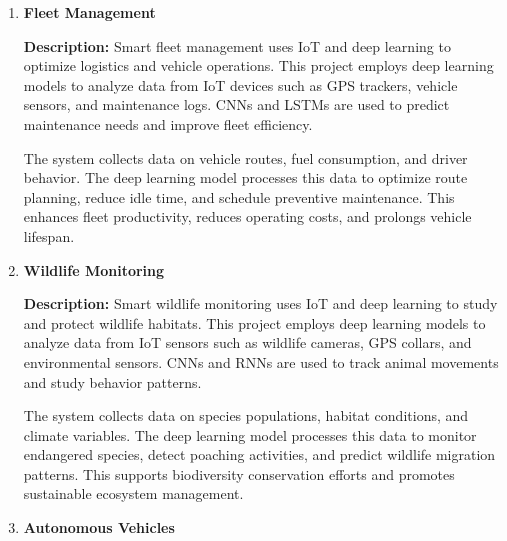\documentclass{article}
\begin{document}
\begin{enumerate}[label=\textbf{\arabic*.}, leftmargin=*]

\vspace{24pt} %
\item \textbf{Fleet Management}

\textbf{Description:}
Smart fleet management uses IoT and deep learning to optimize logistics and vehicle operations. This project employs deep learning models to analyze data from IoT devices such as GPS trackers, vehicle sensors, and maintenance logs. CNNs and LSTMs are used to predict maintenance needs and improve fleet efficiency.

The system collects data on vehicle routes, fuel consumption, and driver behavior. The deep learning model processes this data to optimize route planning, reduce idle time, and schedule preventive maintenance. This enhances fleet productivity, reduces operating costs, and prolongs vehicle lifespan.



\vspace{24pt} %
\item \textbf{Wildlife Monitoring}

\textbf{Description:}
Smart wildlife monitoring uses IoT and deep learning to study and protect wildlife habitats. This project employs deep learning models to analyze data from IoT sensors such as wildlife cameras, GPS collars, and environmental sensors. CNNs and RNNs are used to track animal movements and study behavior patterns.

The system collects data on species populations, habitat conditions, and climate variables. The deep learning model processes this data to monitor endangered species, detect poaching activities, and predict wildlife migration patterns. This supports biodiversity conservation efforts and promotes sustainable ecosystem management.



\vspace{24pt} %
\item \textbf{Autonomous Vehicles}


\end{enumerate}
\end{document}
